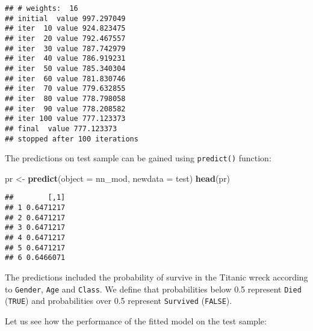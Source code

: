 \documentclass[]{book}
\newenvironment{Shaded}{\begin{snugshade}}{\end{snugshade}}
\newcommand{\KeywordTok}[1]{\textcolor[rgb]{0.13,0.29,0.53}{\textbf{{#1}}}}
\newcommand{\DataTypeTok}[1]{\textcolor[rgb]{0.13,0.29,0.53}{{#1}}}
\newcommand{\DecValTok}[1]{\textcolor[rgb]{0.00,0.00,0.81}{{#1}}}
\newcommand{\StringTok}[1]{\textcolor[rgb]{0.31,0.60,0.02}{{#1}}}
\newcommand{\NormalTok}[1]{{#1}}
\begin{document}
\begin{verbatim}
## # weights:  16
## initial  value 997.297049 
## iter  10 value 924.823475
## iter  20 value 792.467557
## iter  30 value 787.742979
## iter  40 value 786.919231
## iter  50 value 785.340304
## iter  60 value 781.830746
## iter  70 value 779.632855
## iter  80 value 778.798058
## iter  90 value 778.208582
## iter 100 value 777.123373
## final  value 777.123373 
## stopped after 100 iterations
\end{verbatim}

The predictions on test sample can be gained using \texttt{predict()}
function:

\begin{Shaded}
\begin{Highlighting}[]
\NormalTok{pr <-}\StringTok{ }\KeywordTok{predict}\NormalTok{(}\DataTypeTok{object =} \NormalTok{nn_mod, }\DataTypeTok{newdata =} \NormalTok{test)}
\KeywordTok{head}\NormalTok{(pr)}
\end{Highlighting}
\end{Shaded}

\begin{verbatim}
##        [,1]
## 1 0.6471217
## 2 0.6471217
## 3 0.6471217
## 4 0.6471217
## 5 0.6471217
## 6 0.6466071
\end{verbatim}

The predictions included the probability of survive in the Titanic wreck
according to \texttt{Gender}, \texttt{Age} and \texttt{Class}. We define
that probabilities below 0.5 represent \texttt{Died} (\texttt{TRUE}) and
probabilities over 0.5 represent \texttt{Survived} (\texttt{FALSE}).

\begin{Shaded}
\end{Shaded}

Let us see how the performance of the fitted model on the test sample:

\begin{Shaded}
\end{Shaded}
\end{document}
